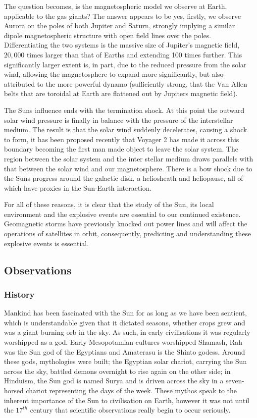The question becomes, is the magnetospheric model we observe at Earth, applicable to the gas giants?
The answer appears to be yes, firstly, we observe Aurora on the poles of both Jupiter and Saturn, strongly implying a similar dipole magnetospheric structure with open field lines over the poles.
Differentiating the two systems is the massive size of Jupiter's magnetic field, $20,000$ times larger than that of Earths and extending 100 times further.
This significantly larger extent is, in part, due to the reduced pressure from the solar wind, allowing the magnetosphere to expand more significantly, but also attributed to the more powerful dynamo (sufficiently strong, that the Van Allen belts that are toroidal at Earth are flattened out by Jupiters magnetic field).

The Suns influence ends with the termination shock.
At this point the outward solar wind pressure is finally in balance with the pressure of the interstellar medium.
The result is that the solar wind suddenly decelerates, causing a shock to form, it has been proposed recently that Voyager 2 has made it across this boundary becoming the first man made object to leave the solar system.
The region between the solar system and the inter stellar medium draws parallels with that between the solar wind and our magnetosphere.
There is a bow shock due to the Suns progress around the galactic disk, a heliosheath and heliopause, all of which have proxies in the Sun-Earth interaction.

For all of these reasons, it is clear that the study of the Sun, its local environment and the explosive events are essential to our continued existence.
Geomagnetic storms have previously knocked out power lines and will affect the operations of satellites in orbit, consequently, predicting and understanding these explosive events is essential.

\subsection{Observations}

\subsubsection{History}
Mankind has been fascinated with the Sun for as long as we have been sentient, which is understandable given that it dictated seasons, whether crops grew and was a giant burning orb in the sky.
As such, in early civilisations it was regularly worshipped as a god.
Early Mesopotamian cultures worshipped Shamash, Rah was the Sun god of the Egyptians and Amaterasu is the Shinto godess.
Around these gods, mythologies were built; the Egyptian solar chariot, carrying the Sun across the sky, battled demons overnight to rise again on the other side; in Hinduism, the Sun god is named Surya and is driven across the sky in a seven-horsed chariot representing the days of the week.
These mythos speak to the inherent importance of the Sun to civilisation on Earth, however it was not until the $17^{th}$ century that scientific observations really begin to occur seriously.


